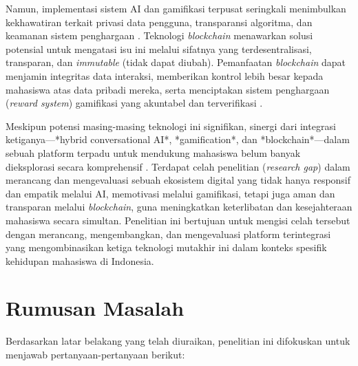 Namun, implementasi sistem AI dan gamifikasi terpusat seringkali menimbulkan kekhawatiran terkait privasi data pengguna, transparansi algoritma, dan keamanan sistem penghargaan \cite{integrated_metaverse_blockchain_ai_education_2025}. Teknologi \textit{blockchain} menawarkan solusi potensial untuk mengatasi isu ini melalui sifatnya yang terdesentralisasi, transparan, dan \textit{immutable} (tidak dapat diubah). Pemanfaatan \textit{blockchain} dapat menjamin integritas data interaksi, memberikan kontrol lebih besar kepada mahasiswa atas data pribadi mereka, serta menciptakan sistem penghargaan (\textit{reward system}) gamifikasi yang akuntabel dan terverifikasi \cite{blockchain_education_transforming_2024, blockchain_security_education_rizky_2021}.

Meskipun potensi masing-masing teknologi ini signifikan, sinergi dari integrasi ketiganya---*hybrid conversational AI*, *gamification*, dan *blockchain*---dalam sebuah platform terpadu untuk mendukung mahasiswa belum banyak dieksplorasi secara komprehensif \cite{integrated_metaverse_blockchain_ai_education_2025}. Terdapat celah penelitian (\textit{research gap}) dalam merancang dan mengevaluasi sebuah ekosistem digital yang tidak hanya responsif dan empatik melalui AI, memotivasi melalui gamifikasi, tetapi juga aman dan transparan melalui \textit{blockchain}, guna meningkatkan keterlibatan dan kesejahteraan mahasiswa secara simultan. Penelitian ini bertujuan untuk mengisi celah tersebut dengan merancang, mengembangkan, dan mengevaluasi platform terintegrasi yang mengombinasikan ketiga teknologi mutakhir ini dalam konteks spesifik kehidupan mahasiswa di Indonesia.


\section{Rumusan Masalah}
\label{sec:rumusan_masalah}

\noindent Berdasarkan latar belakang yang telah diuraikan, penelitian ini difokuskan untuk menjawab pertanyaan-pertanyaan berikut:

